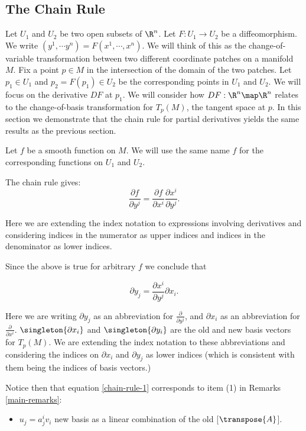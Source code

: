 \documentclass[oneside,12pt]{amsart}
\begin{document}
\subsection{The Chain Rule}
Let $U_1$ and $U_2$ be two open subsets of $\R^n$. Let $F:U_1 \to U_2$ be a diffeomorphism.
We write $(y^1,\cdots y^n) = F(x^1, \cdots, x^n)$.
We will think of this as the change-of-variable transformation between two different coordinate patches
on a manifold $M$. Fix a point $p\in M$ in the intersection of the domain of the two patches. Let 
$p_1 \in U_1$ and $p_2 = F(p_1) \in U_2$ be the corresponding points in $U_1$ and $U_2$.
We will focus on the derivative $DF$ at $p_1$. 
We will consider how $DF:\R^n\map\R^n$ relates to the change-of-basis transformation for
$T_p(M)$, the tangent space at $p$. In this section we demonstrate that the
chain rule for partial derivatives yields the same results as the previous section.

Let $f$ be a smooth function on $M$. We will use the same name $f$ for the corresponding functions on 
$U_1$ and $U_2$.

The chain rule gives: 
$$\frac{\partial f}{\partial y^j} = \frac{\partial f}{\partial x^i}\frac{\partial x^i}{\partial y^j}.$$

Here we are extending the index notation to expressions involving derivatives and considering indices in the numerator as upper indices and indices in the denominator as lower indices.

Since the above is true for arbitrary $f$ we conclude that

\begin{equation}
\label{chain-rule-1}
\partial y_j = \frac{\partial x^i}{\partial y^j} \partial x_i.
\end{equation}

Here we are writing $\partial y_j$ as an abbreviation for $\frac{\partial}{\partial y^j}$,
and $\partial x_i$ as an abbreviation for $\frac{\partial}{\partial x^i}$.
$\singleton{\partial x_i}$ and $\singleton{\partial y_i}$ are the old and new basis
vectors for $T_p(M)$. We are extending the index notation to these abbreviations
and considering the indices on $\partial x_i$ and $\partial y_j$ as lower indices (which
is consistent with them being the indices of basis vectors.)

Notice then that equation \ref{chain-rule-1} corresponds to item (1) in Remarks \ref{main-remarks}:

\begin{itemize}
\item $u_j = a^i_j v_i$ new basis as a linear combination of the old [$\transpose{A}$].
\end{itemize}
\end{document}
